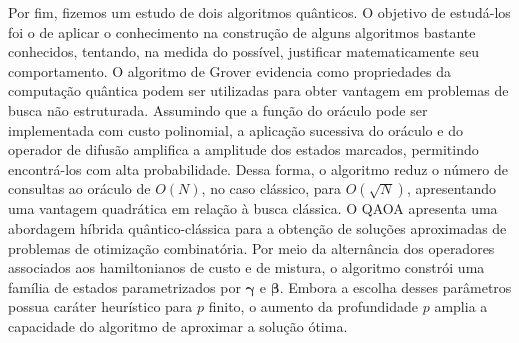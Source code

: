 Por fim, fizemos um estudo de dois algoritmos quânticos. O objetivo de estudá-los foi o de aplicar o conhecimento na construção de alguns algoritmos bastante conhecidos, tentando, na medida do possível, justificar matematicamente seu comportamento. O algoritmo de Grover evidencia como propriedades da computação quântica podem ser utilizadas para obter vantagem em problemas de busca não estruturada. Assumindo que a função do oráculo pode ser implementada com custo polinomial, a aplicação sucessiva do oráculo e do operador de difusão amplifica a amplitude dos estados marcados, permitindo encontrá-los com alta probabilidade. Dessa forma, o algoritmo reduz o número de consultas ao oráculo de $O(N)$, no caso clássico, para $O(\sqrt{N})$, apresentando uma vantagem quadrática em relação à busca clássica. O QAOA apresenta uma abordagem híbrida quântico-clássica para a obtenção de soluções aproximadas de problemas de otimização combinatória. Por meio da alternância dos operadores associados aos hamiltonianos de custo e de mistura, o algoritmo constrói uma família de estados parametrizados por $\boldsymbol{\gamma}$ e $\boldsymbol{\beta}$. Embora a escolha desses parâmetros possua caráter heurístico para $p$ finito, o aumento da profundidade $p$ amplia a capacidade do algoritmo de aproximar a solução ótima.
